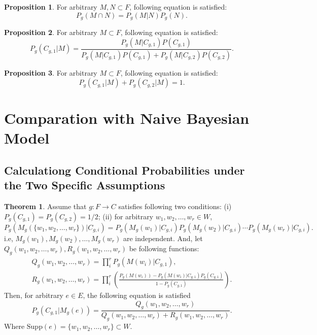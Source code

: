 \documentclass[11pt, a4note]{article}
\theoremstyle{definition}
\newtheorem{proposition}{Proposition}[section]
\newtheorem{theorem}{Theorem}[section]
\begin{document}
\begin{proposition}
For arbitrary $ M, N \subset F $, following equation is satisfied:
\begin{equation}
P_{g}(M \cap N) = P_{g}(M | N)P_{g}(N).
\end{equation}
\end{proposition}

\begin{proposition}
For arbitrary $ M \subset F $, following equation is satisfied:
\begin{equation}
P_{g}(C_{g,1}|M) = \frac{P_{g}(M|C_{g,1})P(C_{g,1})}{P_{g}(M|C_{g,1})P(C_{g,1}) + P_{g}(M|C_{g,2})P(C_{g,2})}.
\end{equation}
\end{proposition}

\begin{proposition}
For arbitrary $ M \subset F $, following equation is satisfied:
\begin{equation}
P_{g}(C_{g,1}|M) + P_{g}(C_{g,2}|M) = 1.
\end{equation}
\end{proposition}

\section{Comparation with Naive Bayesian Model}

\subsection{Calculationg Conditional Probabilities under the Two Specific Assumptions}

\begin{theorem}
Assume that $ g : F \to C $ satisfies following two conditions:
(i) $ P_{g}(C_{g,1}) = P_{g}(C_{g,2}) = 1/2 $;
(ii) for arbitrary $ w_{1}, w_{2}, \dots, w_{r} \in W $,
\begin{equation}
P_{g}(M_{g}(\{ w_{1}, w_{2}, \dots, w_{r} \})|C_{g,i})
= P_{g}(M_{g}(w_{1})|C_{g,i})P_{g}(M_{g}(w_{2})|C_{g,i}) \cdots P_{g}(M_{g}(w_{r})|C_{g,i}).
\end{equation}
i.e, $ M_{g}(w_{1}), M_{g}(w_{2}), \dots, M_{g}(w_{r}) $ are independent.
And, let $ Q_{g}(w_{1}, w_{2}, \dots, w_{r}), R_{g}(w_{1}, w_{2}, \dots, w_{r}) $ be following functions:
\begin{eqnarray}
Q_{g}(w_{1}, w_{2}, \dots, w_{r}) = \prod_{i}^{r}P_{g}(M(w_{i})|C_{g,1}), \\
R_{g}(w_{1}, w_{2}, \dots, w_{r}) = \prod_{i}^{r}(\frac{P_{g}(M(w_{i})) - P_{g}(M(w_{i})|C_{g,1})P_{g}(C_{g,1})}{1 - P_{g}(C_{g,1})}).
\end{eqnarray}
Then, for arbitrary $ e \in E $, the following equation is satisfied
\begin{equation}
P_{g}(C_{g,1}|M_{g}(e))
= \frac{Q_{g}(w_{1}, w_{2}, \dots, w_{r})}{Q_{g}(w_{1}, w_{2}, \dots, w_{r}) + R_{g}(w_{1}, w_{2}, \dots, w_{r})}.
\end{equation}
Where $ \mathrm{Supp}(e) = \{ w_{1}, w_{2}, \dots, w_{r} \} \subset W $.
\end{theorem}
\end{document}
